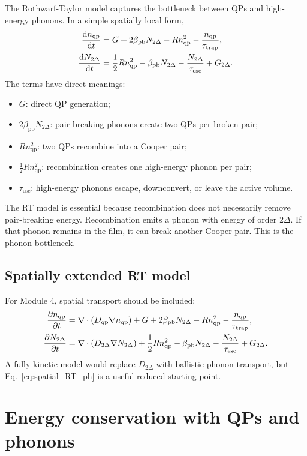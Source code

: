 \documentclass[11pt]{article}
\newcommand{\nqp}{n_{\mathrm{qp}}}
\newcommand{\Npb}{N_{2\Delta}}
\newcommand{\betaPB}{\beta_{\mathrm{pb}}}
\newcommand{\tauesc}{\tau_{\mathrm{esc}}}
\newcommand{\tautrap}{\tau_{\mathrm{trap}}}
\begin{document}
The Rothwarf-Taylor model captures the bottleneck between QPs and high-energy phonons. In a simple spatially local form,
\begin{align}
\dv{\nqp}{t} &= G + 2\betaPB \Npb - R\nqp^2 - \frac{\nqp}{\tautrap},
\label{eq:RT_qp}\\
\dv{\Npb}{t} &= \frac{1}{2}R\nqp^2 - \betaPB\Npb - \frac{\Npb}{\tauesc}+G_{2\Delta}.
\label{eq:RT_ph}
\end{align}
The terms have direct meanings:
\begin{itemize}
\item \(G\): direct QP generation;
\item \(2\betaPB\Npb\): pair-breaking phonons create two QPs per broken pair;
\item \(R\nqp^2\): two QPs recombine into a Cooper pair;
\item \(\frac{1}{2}R\nqp^2\): recombination creates one high-energy phonon per pair;
\item \(\tauesc\): high-energy phonons escape, downconvert, or leave the active volume.
\end{itemize}

The RT model is essential because recombination does not necessarily remove pair-breaking energy. Recombination emits a phonon with energy of order \(2\Delta\). If that phonon remains in the film, it can break another Cooper pair. This is the phonon bottleneck.

\subsection{Spatially extended RT model}

For Module 4, spatial transport should be included:
\begin{align}
\pdv{\nqp}{t}
&=\nabla\cdot(D_{\mathrm{qp}}\nabla\nqp)+G+2\betaPB\Npb-R\nqp^2-\frac{\nqp}{\tautrap},
\label{eq:spatial_RT_qp}\\
\pdv{\Npb}{t}
&=\nabla\cdot(D_{2\Delta}\nabla\Npb)+\frac{1}{2}R\nqp^2-\betaPB\Npb-\frac{\Npb}{\tauesc}+G_{2\Delta}.
\label{eq:spatial_RT_ph}
\end{align}
A fully kinetic model would replace \(D_{2\Delta}\) with ballistic phonon transport, but Eq.~\eqref{eq:spatial_RT_ph} is a useful reduced starting point.

\section{Energy conservation with QPs and phonons}
\end{document}
